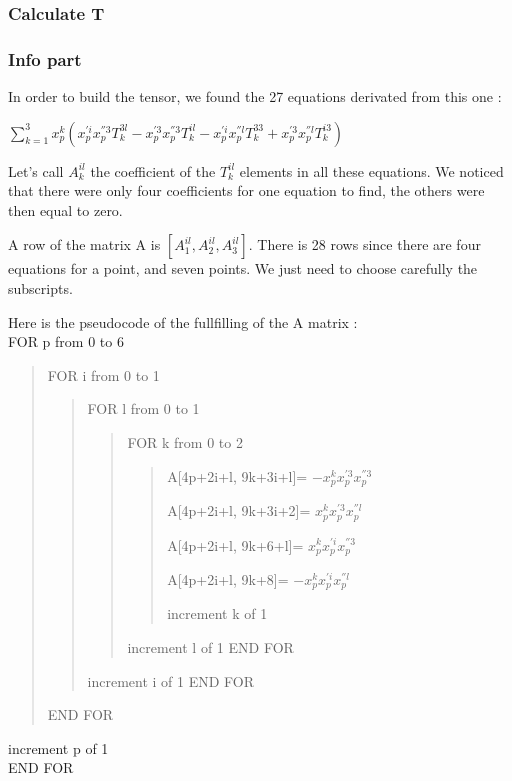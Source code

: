 \documentclass{report}
\begin{document}
\subsubsection{Calculate T}
\subsubsection{Info part}
In order to build the tensor, we found the 27 equations derivated from this one :
\begin{center}
 $ \displaystyle { \sum_{k = 1}^{3}} x_{p}^{k}(x_{p}^{'i}x_{p}^{''3}T_{k}^{3l} - x_{p}^{'3}x_{p}^{''3}T_{k}^{il} - x_{p}^{'i}x_{p}^{''l}T_{k}^{33} + x_{p}^{'3}x_{p}^{''l}T_{k}^{i3})$ 
\end{center}

Let's call $A_{k}^{il}$ the coefficient of the $T_{k}^{il}$ elements in all these equations. We noticed that there were only four coefficients for one equation to find, the others were then equal to zero. 

A row of the matrix A is  $[ A_{1}^{il}, A_{2}^{il}, A_{3}^{il} ]$. There is 28 rows since there are four equations for a point, and seven points. We just need to choose carefully the subscripts. 

Here is the pseudocode of the fullfilling of the A matrix : 
\\FOR p from 0 to 6
	\begin{verse}
	FOR i from 0 to 1
		\begin{verse}
		FOR l from 0 to 1
			\begin{verse}
			FOR k from 0 to 2
\begin{verse}
\begin{list}{•}{•}
\item 
A[4p+2i+l, 9k+3i+l]= $-x_{p}^{k}x_{p}^{'3}x_{p}^{''3}$
\item 
A[4p+2i+l, 9k+3i+2]= $x_{p}^{k}x_{p}^{'3}x_{p}^{''l}$
\item 
A[4p+2i+l, 9k+6+l]=  $x_{p}^{k}x_{p}^{'i}x_{p}^{''3}$
\item 
A[4p+2i+l, 9k+8]=    $-x_{p}^{k}x_{p}^{'i}x_{p}^{''l}$
\end{list}

increment k of 1
\end{verse}
				increment l of 1
			END FOR
			\end{verse}
			increment i of 1		
		END FOR
		\end{verse}	
	END FOR
	\end{verse}
increment p of 1 
\\END FOR
\end{document}
